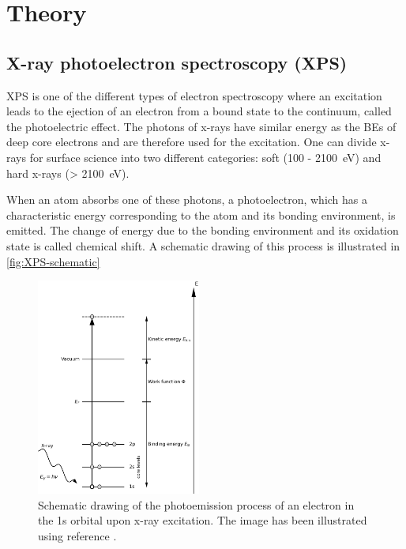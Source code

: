 \chapter{Theory}
\section{X-ray photoelectron spectroscopy (XPS)}

\Acf{XPS} is one of the different types of electron spectroscopy where an excitation leads to the ejection of an electron from a bound state to the continuum, called the photoelectric effect.\autocite{Hertz1887, Einstein1905} The photons of x-rays have similar energy as the \acfp{BE} of deep core electrons and are therefore used for the excitation. One can divide x-rays for surface science into two different categories: soft (100 - 2100~\si{\eV}) and hard x-rays (> 2100~\si{\eV}).

When an atom absorbs one of these photons, a photoelectron, which has a characteristic energy corresponding to the atom and its bonding environment, is emitted. The change of energy due to the bonding environment and its oxidation state is called chemical shift.\autocite{Kolasinski2012}  A schematic drawing of this process is illustrated in \autoref{fig:XPS-schematic}

\begin{figure}[H]
	\centering
	\includegraphics[width=0.48\textwidth]{images/XPS_schematic.png}
	\caption{Schematic drawing of the photoemission process of an electron in the 1s orbital upon x-ray excitation. The image has been illustrated using reference \cite{Attard2011}.}
	\label{fig:XPS-schematic}
\end{figure}


